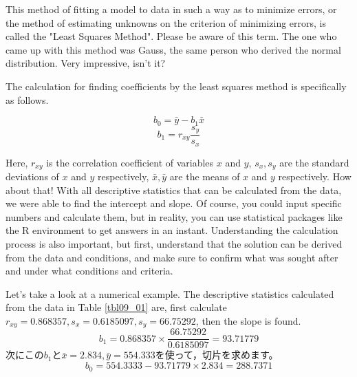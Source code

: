 \documentclass{ltjbook}
\begin{document}
This method of fitting a model to data in such a way as to minimize errors, or the method of estimating unknowns on the criterion of minimizing errors, is called the "Least Squares Method". Please be aware of this term. The one who came up with this method was Gauss, the same person who derived the normal distribution. Very impressive, isn't it?

The calculation for finding coefficients by the least squares method is specifically as follows.

\[ b_0 = \bar{y}-b_1\bar{x} \]
\[ b_1 = r_{xy}\frac{s_y}{s_x} \]

Here, $r_{xy}$ is the correlation coefficient of variables $x$ and $y$, $s_x,s_y$ are the standard deviations of $x$ and $y$ respectively, $\bar{x},\bar{y}$ are the means of $x$ and $y$ respectively. How about that! With all descriptive statistics that can be calculated from the data, we were able to find the intercept and slope.
Of course, you could input specific numbers and calculate them, but in reality, you can use statistical packages like the R environment to get answers in an instant. Understanding the calculation process is also important, but first, understand that the solution can be derived from the data and conditions, and make sure to confirm what was sought after and under what conditions and criteria.

Let's take a look at a numerical example. The descriptive statistics calculated from the data in Table \ref{tbl09_01} are, first calculate $r_{xy}=0.868357,s_x=0.6185097,s_y=66.75292$, then the slope is found.
\[ b_1 = 0.868357 \times \frac{66.75292}{0.6185097} = 93.71779 \]
次にこの$b_1$と$\bar{x} = 2.834,\bar{y}=554.333$を使って，切片を求めます。
\[ b_0 = 554.3333 - 93.71779 \times 2.834 = 288.7371 \]
\end{document}
